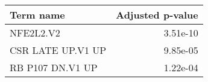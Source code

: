 \begin{tabular}{lr}
\toprule
        Term name &  Adjusted p-value \\
\midrule
        NFE2L2.V2 &          3.51e-10 \\
CSR LATE UP.V1 UP &          9.85e-05 \\
 RB P107 DN.V1 UP &          1.22e-04 \\
\bottomrule
\end{tabular}
